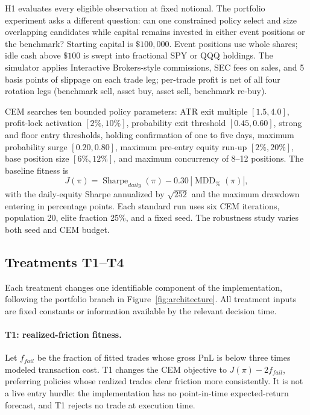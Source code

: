 \documentclass[sigconf,anonymous]{acmart}
\begin{document}
H1 evaluates every eligible observation at fixed notional. The portfolio experiment asks a different question: can one constrained policy select and size overlapping candidates while capital remains invested in either event positions or the benchmark? Starting capital is $\$100{,}000$. Event positions use whole shares; idle cash above $\$100$ is swept into fractional SPY or QQQ holdings. The simulator applies Interactive Brokers-style commissions, SEC fees on sales, and 5 basis points of slippage on each trade leg; per-trade profit is net of all four rotation legs (benchmark sell, asset buy, asset sell, benchmark re-buy).

CEM searches ten bounded policy parameters: ATR exit multiple $[1.5,4.0]$, profit-lock activation $[2\%,10\%]$, probability exit threshold $[0.45,0.60]$, strong and floor entry thresholds, holding confirmation of one to five days, maximum probability surge $[0.20,0.80]$, maximum pre-entry equity run-up $[2\%,20\%]$, base position size $[6\%,12\%]$, and maximum concurrency of 8--12 positions. The baseline fitness is
\[
J(\pi)=\operatorname{Sharpe}_{daily}(\pi)-0.30\,|\operatorname{MDD}_{\%}(\pi)|,
\]
with the daily-equity Sharpe annualized by $\sqrt{252}$ and the maximum drawdown entering in percentage points. Each standard run uses six CEM iterations, population 20, elite fraction 25\%, and a fixed seed. The robustness study varies both seed and CEM budget.

\subsection{Treatments T1--T4}

Each treatment changes one identifiable component of the implementation, following the portfolio branch in Figure~\ref{fig:architecture}. All treatment inputs are fixed constants or information available by the relevant decision time.

\paragraph{T1: realized-friction fitness.}
Let $f_{fail}$ be the fraction of fitted trades whose gross PnL is below three times modeled transaction cost. T1 changes the CEM objective to $J(\pi)-2f_{fail}$, preferring policies whose realized trades clear friction more consistently. It is not a live entry hurdle: the implementation has no point-in-time expected-return forecast, and T1 rejects no trade at execution time.
\end{document}

